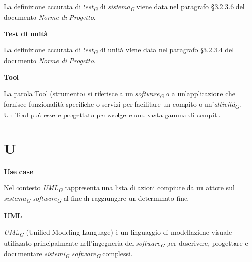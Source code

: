 \documentclass{article}
\begin{document}
La definizione accurata di \textit{test}\textsubscript{\textit{G}} di \textit{sistema}\textsubscript{\textit{G}} viene data nel paragrafo §3.2.3.6 del documento \textit{Norme di Progetto}.

\vspace{0.4cm}

\textbf{Test di unità}

\vspace{0.1cm}

La definizione accurata di \textit{test}\textsubscript{\textit{G}} di unità viene data nel paragrafo §3.2.3.4 del documento \textit{Norme di Progetto}.

\vspace{0.4cm}

\textbf{Tool}

\vspace{0.1cm}

La parola Tool (strumento) si riferisce a un \textit{software}\textsubscript{\textit{G}} o a un'applicazione che fornisce funzionalità specifiche o servizi per facilitare un compito o un'\textit{attività}\textsubscript{\textit{G}}. Un Tool può essere progettato per svolgere una vasta gamma di compiti.

\pagebreak
\section*{U}
{}

\vspace{0.4cm}

\textbf{Use case}

\vspace{0.1cm}

Nel contesto \textit{UML}\textsubscript{\textit{G}} rappresenta una lista di azioni compiute da un attore sul \textit{sistema}\textsubscript{\textit{G}} \textit{software}\textsubscript{\textit{G}} al fine di raggiungere un determinato fine.

\vspace{0.4cm}

\textbf{UML}

\vspace{0.1cm}

\textit{UML}\textsubscript{\textit{G}} (Unified Modeling Language) è un linguaggio di modellazione visuale utilizzato principalmente nell'ingegneria del \textit{software}\textsubscript{\textit{G}} per descrivere, progettare e documentare \textit{sistemi}\textsubscript{\textit{G}} \textit{software}\textsubscript{\textit{G}} complessi.
\end{document}
